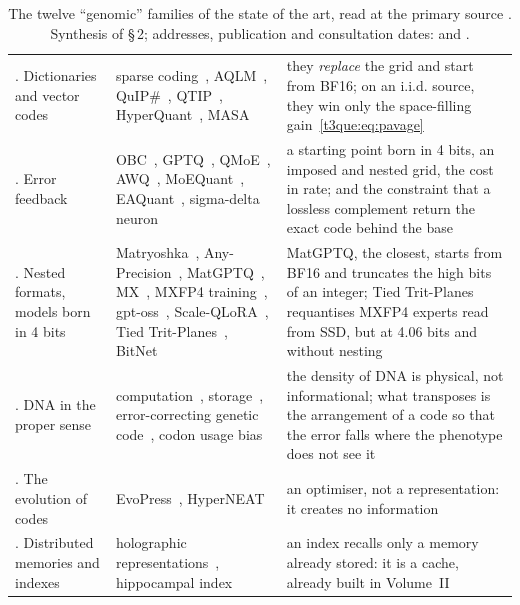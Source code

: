 \begin{table}[p]
\begin{tabularx}{\linewidth}{>{\raggedright\arraybackslash}p{2.3cm} >{\raggedright\arraybackslash}X >{\raggedright\arraybackslash}X}
7. Dictionaries and vector codes & sparse coding~\cite{olshausen1996}, AQLM~\cite{aqlm2024}, QuIP\#~\cite{quipsharp2024}, QTIP~\cite{genome-qtip}, HyperQuant~\cite{domb2026hyperquant}, MASA~\cite{zhussip2025masa} & they \emph{replace} the grid and start from BF16; on an i.i.d. source, they win only the space-filling gain~\eqref{t3que:eq:pavage} \\
8. Error feedback & OBC~\cite{frantar2022obc}, GPTQ~\cite{frantar2022gptq}, QMoE~\cite{frantar2023qmoe}, AWQ~\cite{lin2023awq}, MoEQuant~\cite{hu2025moequant}, EAQuant~\cite{fu2025eaquant}, sigma-delta neuron~\cite{yoon2017sigmadelta} & a starting point born in 4 bits, an imposed and nested grid, the cost in rate; and the constraint that a lossless complement return the exact code behind the base \\
9. Nested formats, models born in 4 bits & Matryoshka~\cite{nair2025matquant}, Any-Precision~\cite{park2024anyprecision}, MatGPTQ~\cite{kleinegger2026matgptq}, MX~\cite{rouhani2023microscaling}, MXFP4 training~\cite{tseng2025mxfp4}, gpt-oss~\cite{openai2025gptoss}, Scale-QLoRA~\cite{li2026scaleqlora}, Tied Trit-Planes~\cite{tiedtrit2026}, BitNet~\cite{bitnet2024} & MatGPTQ, the closest, starts from BF16 and truncates the high bits of an integer; Tied Trit-Planes requantises MXFP4 experts read from SSD, but at 4.06 bits and without nesting \\
10. DNA in the proper sense & computation~\cite{adleman1994}, storage~\cite{church2012dna,goldman2013dna,erlich2017fountain}, error-correcting genetic code~\cite{freeland1998}, codon usage bias~\cite{sharp1987cai} & the density of DNA is physical, not informational; what transposes is the arrangement of a code so that the error falls where the phenotype does not see it \\
11. The evolution of codes & EvoPress~\cite{sieberling2024evopress}, HyperNEAT & an optimiser, not a representation: it creates no information \\
12. Distributed memories and indexes & holographic representations~\cite{plate1995hrr}, hippocampal index~\cite{teyler1986} & an index recalls only a memory already stored: it is a cache, already built in Volume~II \\
\bottomrule
\end{tabularx}
\caption[The twelve families of the state of the art]{The twelve ``genomic'' families of the state of the art, read at the primary source \litt. Synthesis of  §\,2; addresses, publication and consultation dates:  and .}
\label{t3que:tab:familles}
\end{table}

